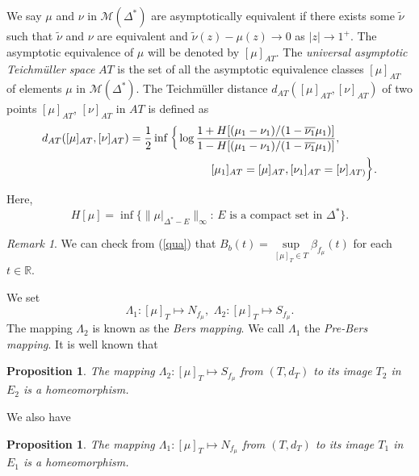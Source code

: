 \documentclass[11pt]{amsart}
\newtheorem{proposition}[theorem]{Proposition}
\theoremstyle{remark}
\newtheorem{remark}[theorem]{Remark}
\theoremstyle{claim}
\theoremstyle{definition}
\theoremstyle{problem}
\theoremstyle{conjecture}
\theoremstyle{question}
\numberwithin{equation}{section}
\begin{document}
We say $\mu$ and $\nu$ in $\mathcal{M}({\Delta}^{*})$ are asymptotically equivalent if there exists some $\widetilde{\nu}$ such that $\widetilde{\nu}$ and $\nu$ are equivalent and $\widetilde{\nu}(z)-\mu(z) \rightarrow 0$ as $|z|\rightarrow 1^{+}$. The asymptotic equivalence
of $\mu$ will be denoted by $[\mu]_{AT}$. The {\em universal asymptotic Teichm\"uller space} $AT$ is the set of
all the asymptotic equivalence classes $[\mu]_{AT}$ of elements $\mu$ in $\mathcal{M}({\Delta}^{*})$. The Teichm\"uller distance $d_{AT}([\mu]_{AT}, [\nu]_{AT})$ of two points $[\mu]_{AT}$, $[\nu]_{AT}$ in $AT$ is defined as
\begin{eqnarray}
\lefteqn{d_{AT}([\mu]_{AT}, [\nu]_{AT})=\frac{1}{2}\inf  \bigg\{ \log \frac{1+H[(\mu_1-\nu_1)/(1-\overline{\nu_1}\mu_1)]}{1-H[(\mu_1-\nu_1)/(1-\overline{\nu_1}\mu_1)]},}
\nonumber \\
&&\quad\quad\qquad\qquad\qquad\qquad\qquad\qquad [\mu_1]_{AT}=[\mu]_{AT}, [\nu_1]_{AT}=[\nu]_{AT)}  \bigg\}. \nonumber
\end{eqnarray}
Here,
\begin{equation}\label{bn}
H[\mu]=\inf\{\|\mu|_{\Delta^{*}-E}\|_{\infty}: \, E {\text { is a compact set in}}\,\,\Delta^{*}\}.\end{equation}
\begin{remark}We can check from (\ref{qua}) that $B_b(t)=\sup\limits_{[\mu]_T\in T} \beta_{f_{\mu}}(t)$ for each $t\in \mathbb{R}$.
\end{remark}
We set
$$\Lambda_1: [\mu]_T  \mapsto  N_{f_{\mu}}, \,\, \Lambda_2: [\mu]_T  \mapsto  S_{f_{\mu}}.$$
The mapping $\Lambda_2$ is known as the {\em Bers mapping}. We call $\Lambda_1$ the {\em Pre-Bers mapping}.  It is well known that

\begin{proposition}\label{bers-2}
The mapping $\Lambda_2: [\mu]_T \mapsto  S_{f_\mu}$ from $(T, d_T)$  to its image $T_2$ in $E_2$ is a homeomorphism.
\end{proposition}

We also have  
\begin{proposition}\label{bers-1}
The mapping $\Lambda_1: [\mu]_T \mapsto  N_{f_{\mu}}$ from $(T, d_{T})$ to its image $T_1$ in $E_1$  is a homeomorphism.
\end{proposition}
\end{document}
